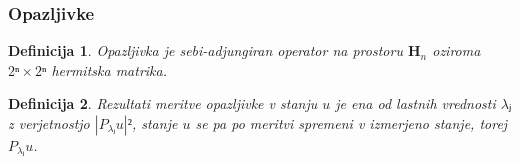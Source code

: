 \documentclass[slovene]{beamer}
\newtheorem{definicija}{Definicija}
{\theoremstyle{example}
    \newtheorem{zgled}{Zgled}
    \newtheorem{primer}{Primer}
    \newtheorem{primeri}{Primeri}
}
\newcommand{\ket}[1]{\left\lvert #1 \right\rangle}
\newcommand{\expval}[2]{{\left\langle #1 \right\rangle}_{\!#2}}
\newcommand{\matelt}[3]{\left\langle #1 \middle\vert #2 \middle\vert #3 \right\rangle}
\renewcommand{\H}[1][]{\mathbf{H}_{#1}}
\newcommand{\g}[1]{\mathtt{#1}}
\newcommand{\ctl}[1]{\g{c#1}}
\newcommand{\airquotes}[1]{\enquote{#1}}
\begin{document}

\begin{frame}
    \frametitle{Opazljivke}

    \begin{definicija}
        Opazljivka je sebi-adjungiran operator na prostoru \(\H[n]\) oziroma \(2ⁿ×2ⁿ\) hermitska matrika.
    \end{definicija}

    \pause
    \begin{definicija}
        Rezultati meritve opazljivke v stanju \(u\) je ena od lastnih vrednosti \(λⱼ\) z verjetnostjo \(|P_{λⱼ}u|²\), stanje \(u\) se pa po meritvi spremeni v izmerjeno stanje, torej \(P_{λⱼ}u\).

    \end{definicija}
\end{frame}
\end{document}
